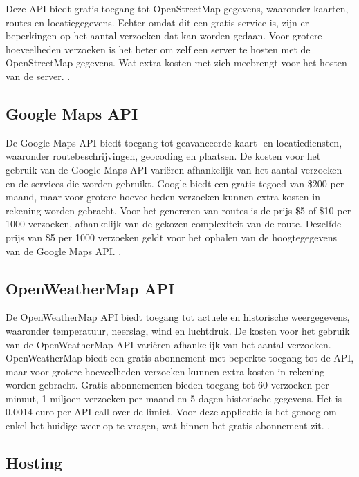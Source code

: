     Deze API biedt gratis toegang tot OpenStreetMap-gegevens, waaronder kaarten, routes en locatiegegevens. Echter omdat dit een gratis service is,
    zijn er beperkingen op het aantal verzoeken dat kan worden gedaan. Voor grotere hoeveelheden verzoeken is het beter om zelf een server te hosten met de OpenStreetMap-gegevens.
    Wat extra kosten met zich meebrengt voor het hosten van de server. \autocite{overpass_api_docs}.


    \subsection{Google Maps API}

    De Google Maps API biedt toegang tot geavanceerde kaart- en locatiediensten, waaronder routebeschrijvingen, geocoding en plaatsen.
    De kosten voor het gebruik van de Google Maps API variëren afhankelijk van het aantal verzoeken en de services die worden gebruikt.
    Google biedt een gratis tegoed van \$200 per maand, maar voor grotere hoeveelheden verzoeken kunnen extra kosten in rekening worden gebracht.
    Voor het genereren van routes is de prijs \$5 of \$10 per 1000 verzoeken, afhankelijk van de gekozen complexiteit van de route.
    Dezelfde prijs van \$5 per 1000 verzoeken geldt voor het ophalen van de hoogtegegevens van de Google Maps API. \autocite{google_maps_api_docs}.

    \subsection{OpenWeatherMap API}

    De OpenWeatherMap API biedt toegang tot actuele en historische weergegevens, waaronder temperatuur, neerslag, wind en luchtdruk.
    De kosten voor het gebruik van de OpenWeatherMap API variëren afhankelijk van het aantal verzoeken.
    OpenWeatherMap biedt een gratis abonnement met beperkte toegang tot de API, maar voor grotere hoeveelheden verzoeken kunnen extra kosten in rekening worden gebracht.
    Gratis abonnementen bieden toegang tot 60 verzoeken per minuut, 1 miljoen verzoeken per maand en 5 dagen historische gegevens.
    Het is 0.0014 euro per API call over de limiet. Voor deze applicatie is het genoeg om enkel het huidige weer op te vragen, wat binnen het gratis abonnement zit.
    \autocite{openweathermap_api_docs}.

    \subsection{Hosting}

